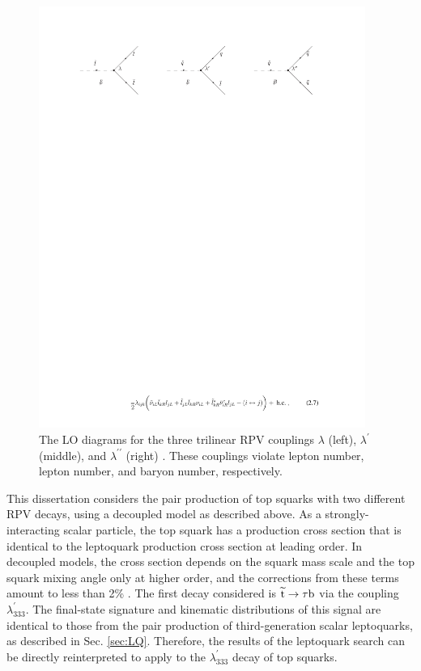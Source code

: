 \documentclass[12pt]{thesis}  %
\begin{document}
\begin{figure}[hbt]
\begin{center}
\includegraphics[width=0.95\textwidth]{figures/0406039v2_trilinear.pdf}
\caption{The LO diagrams for the three trilinear RPV couplings $\lambda$ (left), $\lambda^{\prime}$ (middle), and $\lambda^{\prime \prime}$ (right) \cite{Barbier}. These couplings violate lepton number, lepton number, and baryon number, respectively.}
\label{fig:trilinear-RPV}
\end{center}
\end{figure}

This dissertation considers the pair production of top squarks with two different RPV decays, using a decoupled model as described above. As a strongly-interacting scalar particle, the top squark has a production cross section that is identical to the leptoquark production cross section at leading order. In decoupled models, the cross section depends on the squark mass scale and the top squark mixing angle only at higher order, and the corrections from these terms amount to less than 2\% \cite{StopCrossSec}. The first decay considered is $\widetilde{\mathrm{t}} \rightarrow \tau \mathrm{b}$ via the coupling $\lambda_{333}^{\prime}$. The final-state signature and kinematic distributions of this signal are identical to those from the pair production of third-generation scalar leptoquarks, as described in Sec. \ref{sec:LQ}. Therefore, the results of the leptoquark search can be directly reinterpreted to apply to the $\lambda_{333}^{\prime}$ decay of top squarks.
\end{document}
